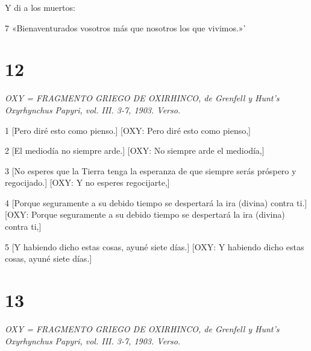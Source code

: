 \par Y di a los muertos:

\par 7 «Bienaventurados vosotros más que nosotros los que vivimos.»'

\chapter{12}

\par \textit{OXY = FRAGMENTO GRIEGO DE OXIRHINCO, de Grenfell y Hunt's Oxyrhynchus Papyri, vol. III. 3-7, 1903. Verso.}

\par 1 [Pero diré esto como pienso.] [OXY: Pero diré esto como pienso,]

\par [Y hablaré contra ti, tierra que aún prospera.] [OXY: Y hablaré contra ti, tierra que prospera.]

\par 2 [El mediodía no siempre arde.] [OXY: No siempre arde el mediodía,]

\par [Ni los rayos del sol dan luz constantemente.] [OXY: Ni los rayos del sol dan luz constantemente.]

\par 3 [No esperes que la Tierra tenga la esperanza de que siempre serás próspero y regocijado.] [OXY: Y no esperes regocijarte,]

\par [Y no os envanezcáis ni os jactéis mucho.] [OXY: Ni condenéis mucho.]

\par 4 [Porque seguramente a su debido tiempo se despertará la ira (divina) contra ti.] [OXY: Porque seguramente a su debido tiempo se despertará la ira (divina) contra ti,]

\par [El cual ahora con gran paciencia está retenido como por riendas.] [OXY: Que ahora está retenido por gran paciencia como por riendas.]

\par 5 [Y habiendo dicho estas cosas, ayuné siete días.] [OXY: Y habiendo dicho estas cosas, ayuné siete días.]


\chapter{13}

\par \textit{OXY = FRAGMENTO GRIEGO DE OXIRHINCO, de Grenfell y Hunt's Oxyrhynchus Papyri, vol. III. 3-7, 1903. Verso.}

